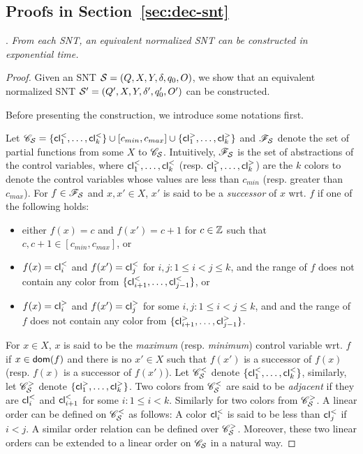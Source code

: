 \begin{appendix}
\section{Proofs in Section~\ref{sec:dec-snt}}


.
{\it From each SNT, an equivalent normalized SNT can be constructed in exponential time.} 


\newcommand{\tog}[1]{\mathsf{toGuard(#1)}}
\newcommand{\toec}[1]{\mathsf{toEqClass(#1)}}
\begin{proof}
Given an SNT ${\mathcal{S} }=(Q, X, Y, \delta, q_0, O)$, we show that an equivalent normalized SNT ${{\mathcal{S} }}'=(Q', X, Y, \delta', q'_0, O')$  can be constructed.

Before presenting the construction, we introduce some notations first.

Let $\mathscr{C}_{\mathcal{S} }=\{\mathsf{cl}^{<}_{1},\dots, \mathsf{cl}^{<}_{k}\} \cup [c_{min}, c_{max}] \cup \{\mathsf{cl}^{>}_{1},\dots, \mathsf{cl}^{>}_{k}\}$ and $\mathscr{F}_{\mathcal{S} }$ denote the set of partial functions from some $X$ to $\mathscr{C}_{\mathcal{S} }$. Intuitively, $\mathscr{F}_{\mathcal{S} }$ is the set of abstractions of the control variables, where $\mathsf{cl}^{<}_{1},\dots, \mathsf{cl}^{<}_{k}$ (resp. $\mathsf{cl}^{>}_{1},\dots, \mathsf{cl}^{>}_{k}$) are the $k$ colors to denote the control variables whose values are less than $c_{min}$ (resp. greater than $c_{max}$). For $f \in \mathscr{F}_{\mathcal{S} }$ and $x, x' \in X$, $x'$ is said to be a \emph{successor} of $x$ wrt. $f$ if one of the following holds: 
\begin{itemize}
\item either $f(x)=c$ and $f(x')=c+1$ for $c \in {\mathbb{Z} }$ such that $c, c+1 \in [c_{min},c_{max}]$, or

\item $f(x) = \mathsf{cl}^{<}_i$ and $f(x') = \mathsf{cl}^{<}_{j}$ for $i,j: 1 \le i < j \le k$, and the range of $f$ does not contain any color from $\{\mathsf{cl}^{<}_{i+1},\dots, \mathsf{cl}^{<}_{j-1}\}$, or

\item $f(x) = \mathsf{cl}^{>}_i$ and $f(x') = \mathsf{cl}^{>}_{j}$ for some $i,j: 1 \le i < j \le k$, and and the range of $f$ does not contain any color from $\{\mathsf{cl}^{>}_{i+1},\dots, \mathsf{cl}^{>}_{j-1}\}$. 
\end{itemize}
For $x \in X$, $x$ is said to be the \emph{maximum} (resp. \emph{minimum}) control variable wrt. $f$ if $x \in \mathsf{dom}(f)$ and there is no $x' \in X$ such that $f(x')$ is a successor of $f(x)$ (resp. $f(x)$ is a successor of $f(x')$). Let $\mathscr{C}^{<}_{\mathcal{S} }$ denote $\{\mathsf{cl}^{<}_{1},\dots, \mathsf{cl}^{<}_{k}\}$, similarly, let $\mathscr{C}^{>}_{\mathcal{S} }$ denote $\{\mathsf{cl}^{>}_{1},\dots, \mathsf{cl}^{>}_{k}\}$. Two colors from $\mathscr{C}^{<}_{\mathcal{S} }$ are said to be \emph{adjacent} if they are $\mathsf{cl}^{<}_i$ and $\mathsf{cl}^<_{i+1}$ for some $i: 1 \le i < k$. Similarly for two colors from $\mathscr{C}^>_{\mathcal{S} }$. A linear order can be defined on $\mathscr{C}^<_{\mathcal{S} }$ as follows: A color $\mathsf{cl}^<_i$ is said to be less than $\mathsf{cl}^<_j$ if $i<j$. A similar order relation can be defined over $\mathscr{C}^>_{\mathcal{S} }$. Moreover, these two linear orders can be extended to a linear order on $\mathscr{C}_{\mathcal{S} }$ in a natural way.


\end{proof}
\end{appendix}
